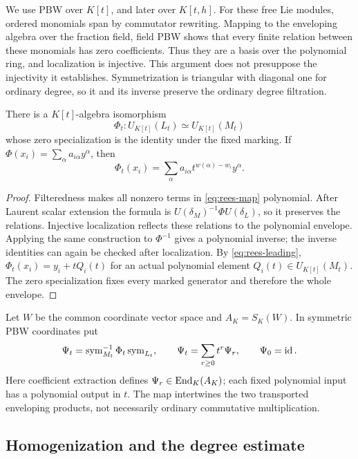 We use PBW over $K[t]$, and later over $K[t,h]$. For these free
Lie modules, ordered monomials span by commutator rewriting. Mapping
to the enveloping algebra over the fraction field, field PBW shows
that every finite relation between these monomials has zero
coefficients. Thus they are a basis over the polynomial ring, and
localization is injective. This argument does not presuppose the
injectivity it establishes. Symmetrization is triangular with
diagonal one for ordinary degree, so it and its inverse preserve
the ordinary degree filtration.

\begin{proposition}\label{prop:rees-isomorphism}
There is a $K[t]$-algebra isomorphism
\[
 \Phi_t:U_{K[t]}(L_t)\simeq U_{K[t]}(M_t)
\]
whose zero specialization is the identity under the fixed marking.
If $\Phi(x_i)=\sum_\alpha a_{i\alpha}y^\alpha$, then
\begin{equation}\label{eq:rees-map}
 \Phi_t(x_i)=\sum_\alpha
 a_{i\alpha}t^{w(\alpha)-w_i}y^\alpha.
\end{equation}
\end{proposition}

\begin{proof}
Filteredness makes all nonzero terms in \eqref{eq:rees-map}
polynomial. After Laurent scalar extension the formula is
$U(\delta_M)^{-1}\Phi U(\delta_L)$, so it preserves the relations.
Injective localization reflects these relations to the polynomial
envelope. Applying the same construction to $\Phi^{-1}$ gives a
polynomial inverse; the inverse identities can again be checked
after localization. By \eqref{eq:rees-leading},
$\Phi_t(x_i)=y_i+tQ_i(t)$ for an actual polynomial element
$Q_i(t)\in U_{K[t]}(M_t)$. The zero specialization fixes
every marked generator and therefore the whole envelope.
\end{proof}

Let $W$ be the common coordinate vector space and $A_K=S_K(W)$.
In symmetric PBW coordinates put
\[
 \Psi_t=\operatorname{sym}_{M_t}^{-1}\Phi_t\operatorname{sym}_{L_t},
 \qquad \Psi_t=\sum_{r\geq0}t^r\Psi_r,\qquad \Psi_0=\operatorname{id}.
\]
Here coefficient extraction defines $\Psi_r\in\operatorname{End}_K(A_K)$;
each fixed polynomial input has a polynomial output in $t$.
The map intertwines the two transported enveloping products,
not necessarily ordinary commutative multiplication.

\subsection{Homogenization and the degree estimate}

